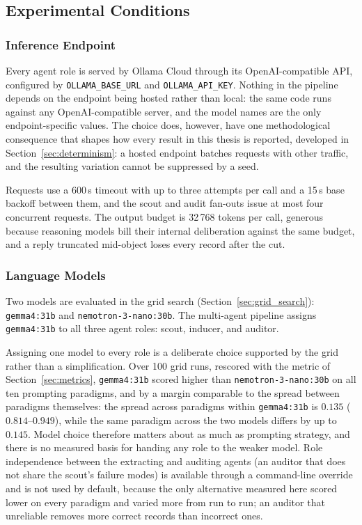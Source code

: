 \documentclass[11pt]{article}
\begin{document}
\subsection{Experimental Conditions}
\label{sec:experimental_conditions}

\subsubsection{Inference Endpoint}
\label{sec:endpoint}
Every agent role is served by Ollama Cloud through its OpenAI-compatible API,
configured by \texttt{OLLAMA\_BASE\_URL} and \texttt{OLLAMA\_API\_KEY}. Nothing
in the pipeline depends on the endpoint being hosted rather than local: the same
code runs against any OpenAI-compatible server, and the model names are the only
endpoint-specific values. The choice does, however, have one methodological
consequence that shapes how every result in this thesis is reported, developed
in Section~\ref{sec:determinism}: a hosted endpoint batches requests with other
traffic, and the resulting variation cannot be suppressed by a seed.

Requests use a 600\,s timeout with up to three attempts per call and a 15\,s
base backoff between them,
and the scout and audit fan-outs issue at most four concurrent requests. The
output budget is 32\,768 tokens per call, generous because reasoning models bill
their internal deliberation against the same budget, and a reply truncated
mid-object loses every record after the cut.

\subsubsection{Language Models}
Two models are evaluated in the grid search (Section~\ref{sec:grid_search}):
\texttt{gemma4:31b} and \texttt{nemotron-3-nano:30b}. The multi-agent pipeline
assigns \texttt{gemma4:31b} to all three agent roles: scout, inducer, and
auditor.

Assigning one model to every role is a deliberate choice supported by the grid
rather than a simplification. Over 100 grid runs, rescored with the metric of Section~\ref{sec:metrics},
\texttt{gemma4:31b} scored higher than \texttt{nemotron-3-nano:30b} on all ten
prompting paradigms, and by a margin comparable to the spread between paradigms
themselves: the spread across paradigms within \texttt{gemma4:31b} is $0.135$
($0.814$--$0.949$), while the same paradigm across the two models differs by up
to $0.145$. Model choice therefore matters about as much
as prompting strategy, and there is no measured basis for handing any role to the
weaker model. Role independence between the extracting and auditing agents (an
auditor that does not share the scout's failure modes) is available through a
command-line override and is not used by default, because the only alternative
measured here scored lower on every paradigm and varied more from run to run; an
auditor that unreliable removes more correct records than incorrect ones.
\end{document}
